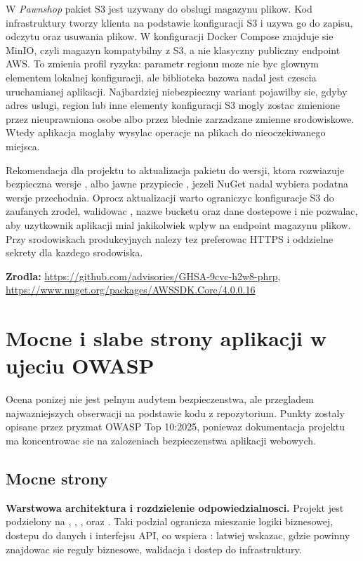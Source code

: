 \documentclass[12pt,a4paper]{article}
\begin{document}
W \textit{Pawnshop} pakiet S3 jest uzywany do obslugi magazynu plikow. Kod infrastruktury tworzy klienta  na podstawie konfiguracji S3 i uzywa go do zapisu, odczytu oraz usuwania plikow. W konfiguracji Docker Compose znajduje sie MinIO, czyli magazyn kompatybilny z S3, a nie klasyczny publiczny endpoint AWS. To zmienia profil ryzyka: parametr regionu moze nie byc glownym elementem lokalnej konfiguracji, ale biblioteka bazowa nadal jest czescia uruchamianej aplikacji. Najbardziej niebezpieczny wariant pojawilby sie, gdyby adres uslugi, region lub inne elementy konfiguracji S3 mogly zostac zmienione przez nieuprawniona osobe albo przez blednie zarzadzane zmienne srodowiskowe. Wtedy aplikacja moglaby wysylac operacje na plikach do nieoczekiwanego miejsca.

Rekomendacja dla projektu to aktualizacja pakietu  do wersji, ktora rozwiazuje bezpieczna wersje , albo jawne przypiecie , jezeli NuGet nadal wybiera podatna wersje przechodnia. Oprocz aktualizacji warto ograniczyc konfiguracje S3 do zaufanych zrodel, walidowac , nazwe bucketu oraz dane dostepowe i nie pozwalac, aby uzytkownik aplikacji mial jakikolwiek wplyw na endpoint magazynu plikow. Przy srodowiskach produkcyjnych nalezy tez preferowac HTTPS i oddzielne sekrety dla kazdego srodowiska.

\textbf{Zrodla:} \url{https://github.com/advisories/GHSA-9cvc-h2w8-phrp}, \url{https://www.nuget.org/packages/AWSSDK.Core/4.0.0.16}

\clearpage
\section{Mocne i slabe strony aplikacji w ujeciu OWASP}

Ocena ponizej nie jest pelnym audytem bezpieczenstwa, ale przegladem najwazniejszych obserwacji na podstawie kodu z repozytorium. Punkty zostaly opisane przez pryzmat OWASP Top 10:2025, poniewaz dokumentacja projektu ma koncentrowac sie na zalozeniach bezpieczenstwa aplikacji webowych.

\subsection{Mocne strony}

\textbf{Warstwowa architektura i rozdzielenie odpowiedzialnosci.} Projekt jest podzielony na , , ,  oraz . Taki podzial ogranicza mieszanie logiki biznesowej, dostepu do danych i interfejsu API, co wspiera : latwiej wskazac, gdzie powinny znajdowac sie reguly biznesowe, walidacja i dostep do infrastruktury.
\end{document}
